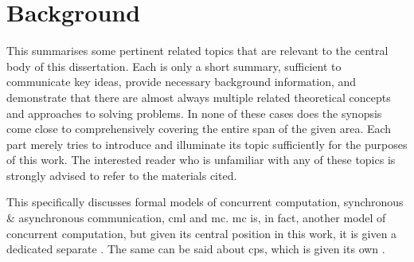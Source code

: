 \chapter{\label{chap:back}Background}

This  summarises some pertinent related topics that are relevant to the central body of this dissertation.  Each is only a short summary, sufficient to communicate key ideas, provide necessary background information, and demonstrate that there are almost always multiple related theoretical concepts and approaches to solving problems.  In none of these cases does the synopsis come close to comprehensively covering the entire span of the given area.  Each part merely tries to introduce and illuminate its topic sufficiently for the purposes of this work.  The interested reader who is unfamiliar with any of these topics is strongly advised to refer to the materials cited.


This  specifically discusses formal models of concurrent computation, synchronous \& asynchronous communication, \gls{cml} and \gls{mc}.  \Gls{mc} is, in fact, another model of concurrent computation, but given its central position in this work, it is given a dedicated separate .  The same can be said about \gls{cps}, which is given its own .




